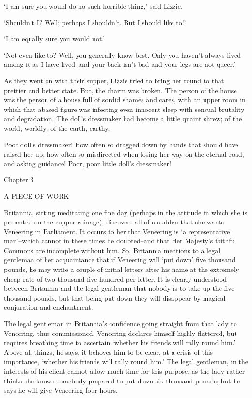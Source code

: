 ‘I am sure you would do no such horrible thing,’ said Lizzie.

‘Shouldn’t I? Well; perhaps I shouldn’t. But I should like to!’

‘I am equally sure you would not.’

‘Not even like to? Well, you generally know best. Only you haven’t
always lived among it as I have lived--and your back isn’t bad and your
legs are not queer.’

As they went on with their supper, Lizzie tried to bring her round to
that prettier and better state. But, the charm was broken. The person
of the house was the person of a house full of sordid shames and cares,
with an upper room in which that abased figure was infecting even
innocent sleep with sensual brutality and degradation. The doll’s
dressmaker had become a little quaint shrew; of the world, worldly; of
the earth, earthy.

Poor doll’s dressmaker! How often so dragged down by hands that should
have raised her up; how often so misdirected when losing her way on the
eternal road, and asking guidance! Poor, poor little doll’s dressmaker!



Chapter 3

A PIECE OF WORK


Britannia, sitting meditating one fine day (perhaps in the attitude in
which she is presented on the copper coinage), discovers all of a sudden
that she wants Veneering in Parliament. It occurs to her that Veneering
is ‘a representative man’--which cannot in these times be doubted--and
that Her Majesty’s faithful Commons are incomplete without him. So,
Britannia mentions to a legal gentleman of her acquaintance that if
Veneering will ‘put down’ five thousand pounds, he may write a couple
of initial letters after his name at the extremely cheap rate of two
thousand five hundred per letter. It is clearly understood between
Britannia and the legal gentleman that nobody is to take up the five
thousand pounds, but that being put down they will disappear by magical
conjuration and enchantment.

The legal gentleman in Britannia’s confidence going straight from that
lady to Veneering, thus commissioned, Veneering declares himself highly
flattered, but requires breathing time to ascertain ‘whether his friends
will rally round him.’ Above all things, he says, it behoves him to be
clear, at a crisis of this importance, ‘whether his friends will rally
round him.’ The legal gentleman, in the interests of his client cannot
allow much time for this purpose, as the lady rather thinks she knows
somebody prepared to put down six thousand pounds; but he says he will
give Veneering four hours.

